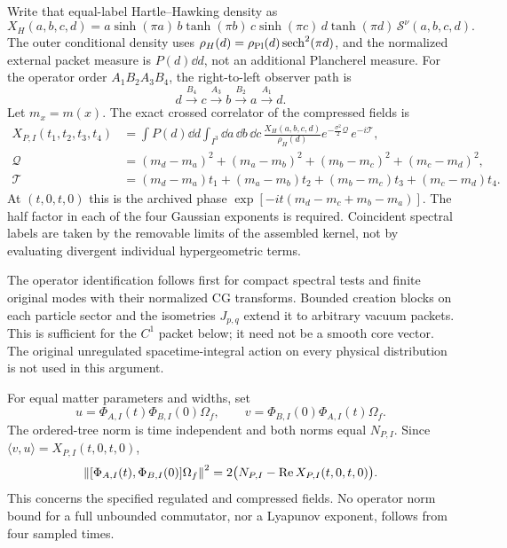 Write that equal-label Hartle--Hawking density as
\begin{equation}
 X_H(a,b,c,d)=
 a\sinh(\pi a)\,b\tanh(\pi b)\,
 c\sinh(\pi c)\,d\tanh(\pi d)\,\mathcal S^\nu(a,b,c,d).
\end{equation}
The outer conditional density uses
$\rho_H(d)=\rho_{\mathrm{Pl}}(d)\operatorname{sech}^2(\pi d)$, and the normalized external packet
measure is $P(d)\dd d$, not an additional Plancherel measure.
For the operator order $A_1B_2A_3B_4$, the right-to-left observer path is
\begin{equation}
 d\xrightarrow{B_4}c\xrightarrow{A_3}b
   \xrightarrow{B_2}a\xrightarrow{A_1}d.
\end{equation}
Let $m_x=m(x)$. The exact crossed correlator of the compressed fields is
\begin{align}
 X_{P,I}(t_1,t_2,t_3,t_4)
 &=\int P(d)\dd d\int_{I^3}\dd a\,\dd b\,\dd c\,
       \frac{X_H(a,b,c,d)}{\rho_H(d)}
       e^{-\frac{\sigma^2}{2}\mathcal Q}\,e^{-i\mathcal T},\\
 \mathcal Q&=(m_d-m_a)^2+(m_a-m_b)^2+
             (m_b-m_c)^2+(m_c-m_d)^2,\\
 \mathcal T&=(m_d-m_a)t_1+(m_a-m_b)t_2+
             (m_b-m_c)t_3+(m_c-m_d)t_4.
 \label{eq:cross-time}
\end{align}
At $(t,0,t,0)$ this is the archived phase
$\exp[-it(m_d-m_c+m_b-m_a)]$. The half factor in each of the four
Gaussian exponents is required. Coincident spectral labels are taken by
the removable limits of the assembled kernel, not by evaluating divergent
individual hypergeometric terms.

The operator identification follows first for compact spectral tests and
finite original modes with their normalized CG transforms. Bounded
creation blocks on each particle sector and the isometries $J_{p,q}$
extend it to arbitrary vacuum packets. This is sufficient for the
$C^1$ packet below; it need not be a smooth core vector. The original
unregulated spacetime-integral action on every physical distribution is
not used in this argument.

For equal matter parameters and widths, set
\[
 u=\Phi_{A,I}(t)\Phi_{B,I}(0)\Omega_f,\qquad
 v=\Phi_{B,I}(0)\Phi_{A,I}(t)\Omega_f.
\]
The ordered-tree norm is time independent and both norms equal $N_{P,I}$.
Since $\langle v,u\rangle=X_{P,I}(t,0,t,0)$,
\begin{equation}
 \left\lVert[\Phi_{A,I}(t),\Phi_{B,I}(0)]\Omega_f\right\rVert^2
 =2\bigl(N_{P,I}-\operatorname{Re}X_{P,I}(t,0,t,0)\bigr).
 \label{eq:commutator-norm}
\end{equation}
This concerns the specified regulated and compressed fields. No operator
norm bound for a full unbounded commutator, nor a Lyapunov exponent,
follows from four sampled times.

